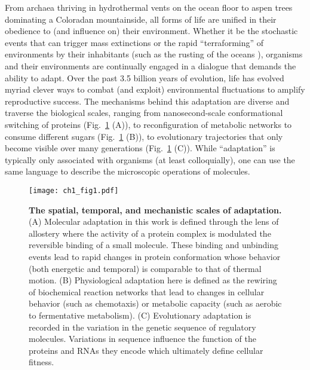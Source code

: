 \documentclass[12pt]{caltech_thesis}
\begin{document}
From archaea thriving in hydrothermal vents on the ocean floor to aspen
trees dominating a Coloradan mountainside, all forms of life are unified
in their obedience to (and influence on) their environment. Whether it
be the stochastic events that can trigger mass extinctions
\autocite{jablonski2001} or the rapid ``terraforming'' of environments
by their inhabitants (such as the rusting of the oceans
\autocite{luo2018}), organisms and their environments are continually
engaged in a dialogue that demands the ability to adapt. Over the past
3.5 billion years of evolution, life has evolved myriad clever ways to
combat (and exploit) environmental fluctuations to amplify reproductive
success. The mechanisms behind this adaptation are diverse and traverse
the biological scales, ranging from nanosecond-scale conformational
switching of proteins (Fig.~\ref{fig:adaptation_levels} (A)), to
reconfiguration of metabolic networks to consume different sugars
(Fig.~\ref{fig:adaptation_levels} (B)), to evolutionary trajectories
that only become visible over many generations
(Fig.~\ref{fig:adaptation_levels} (C)). While ``adaptation'' is
typically only associated with organisms (at least colloquially), one
can use the same language to describe the microscopic operations of
molecules.

\hypertarget{fig:adaptation_levels}{%
\begin{figure}
\centering
\texttt{[image: ch1\_fig1.pdf]}
\caption[{The spatial, temporal, and mechanistic scales of
adaptation.}]{\textbf{The spatial, temporal, and mechanistic scales of
adaptation.} (A) Molecular adaptation in this work is defined through
the lens of allostery where the activity of a protein complex is
modulated the reversible binding of a small molecule. These binding and
unbinding events lead to rapid changes in protein conformation whose
behavior (both energetic and temporal) is comparable to that of thermal
motion. (B) Physiological adaptation here is defined as the rewiring of
biochemical reaction networks that lead to changes in cellular behavior
(such as chemotaxis) or metabolic capacity (such as aerobic to
fermentative metabolism). (C) Evolutionary adaptation is recorded in the
variation in the genetic sequence of regulatory molecules. Variations in
sequence influence the function of the proteins and RNAs they encode
which ultimately define cellular fitness.}
\label{fig:adaptation_levels}
\end{figure}
}
\end{document}
